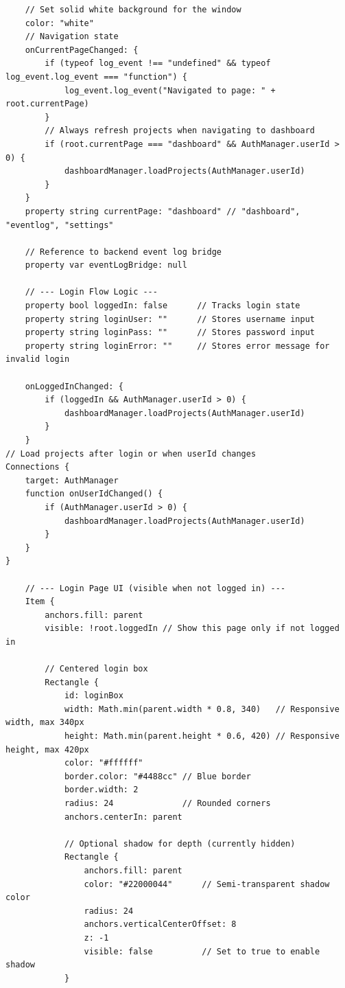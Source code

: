 \documentclass{report}
\begin{document}
\begin{lstlisting}
    // Set solid white background for the window
    color: "white"
    // Navigation state
    onCurrentPageChanged: {
        if (typeof log_event !== "undefined" && typeof log_event.log_event === "function") {
            log_event.log_event("Navigated to page: " + root.currentPage)
        }
        // Always refresh projects when navigating to dashboard
        if (root.currentPage === "dashboard" && AuthManager.userId > 0) {
            dashboardManager.loadProjects(AuthManager.userId)
        }
    }
    property string currentPage: "dashboard" // "dashboard", "eventlog", "settings"

    // Reference to backend event log bridge
    property var eventLogBridge: null

    // --- Login Flow Logic ---
    property bool loggedIn: false      // Tracks login state
    property string loginUser: ""      // Stores username input
    property string loginPass: ""      // Stores password input
    property string loginError: ""     // Stores error message for invalid login

    onLoggedInChanged: {
        if (loggedIn && AuthManager.userId > 0) {
            dashboardManager.loadProjects(AuthManager.userId)
        }
    }
// Load projects after login or when userId changes
Connections {
    target: AuthManager
    function onUserIdChanged() {
        if (AuthManager.userId > 0) {
            dashboardManager.loadProjects(AuthManager.userId)
        }
    }
}

    // --- Login Page UI (visible when not logged in) ---
    Item {
        anchors.fill: parent
        visible: !root.loggedIn // Show this page only if not logged in

        // Centered login box
        Rectangle {
            id: loginBox
            width: Math.min(parent.width * 0.8, 340)   // Responsive width, max 340px
            height: Math.min(parent.height * 0.6, 420) // Responsive height, max 420px
            color: "#ffffff"
            border.color: "#4488cc" // Blue border
            border.width: 2
            radius: 24              // Rounded corners
            anchors.centerIn: parent

            // Optional shadow for depth (currently hidden)
            Rectangle {
                anchors.fill: parent
                color: "#22000044"      // Semi-transparent shadow color
                radius: 24
                anchors.verticalCenterOffset: 8
                z: -1
                visible: false          // Set to true to enable shadow
            }


\end{lstlisting}
\end{document}
